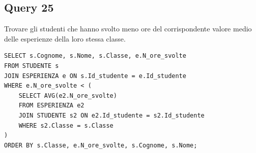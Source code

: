 \documentclass[a4paper,12pt]{article}
\begin{document}
\subsection*{Query 25}Trovare gli studenti che hanno svolto meno ore del corrispondente valore medio delle esperienze della loro stessa classe.
\begin{lstlisting}
SELECT s.Cognome, s.Nome, s.Classe, e.N_ore_svolte
FROM STUDENTE s
JOIN ESPERIENZA e ON s.Id_studente = e.Id_studente
WHERE e.N_ore_svolte < (
    SELECT AVG(e2.N_ore_svolte)
    FROM ESPERIENZA e2
    JOIN STUDENTE s2 ON e2.Id_studente = s2.Id_studente
    WHERE s2.Classe = s.Classe
)
ORDER BY s.Classe, e.N_ore_svolte, s.Cognome, s.Nome;
\end{lstlisting}
\end{document}
